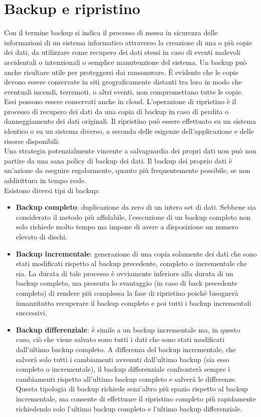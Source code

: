 \documentclass[12pt]{report}
\begin{document}
	\section{Backup e ripristino}
	Con il termine backup si indica il processo di messa in sicurezza delle informazioni di un sistema informatico attraverso la creazione di una o più copie dei dati, da utilizzare come recupero dei dati stessi in caso di eventi malevoli accidentali o intenzionali o semplice manutenzione del sistema. Un backup può anche risultare utile per proteggersi dai ransomware. È evidente che le copie devono essere conservate in siti geograficamente distanti tra loro in modo che eventuali incendi, terremoti, o altri eventi, non compromettano tutte le copie. Essi possono essere conservati anche in cloud. L'operazione di ripristino è il processo di recupero dei dati da una copia di backup in caso di perdita o danneggiamento dei dati originali. Il ripristino può essere effettuato su un sistema identico o su un sistema diverso, a seconda delle esigenze dell'applicazione e delle risorse disponibili.
	\vspace{\baselineskip}\\
	Una strategia potenzialmente vincente a salvaguardia dei propri dati non può non partire da una sana policy di backup dei dati. Il backup dei proprio dati è un’azione da eseguire regolarmente, quanto più frequentemente possibile, se non addirittura in tempo reale.
	\vspace{\baselineskip}\\
	Esistono diversi tipi di backup:
	\begin{itemize}
		\item \textbf{Backup completo}: duplicazione da zero di un intero set di dati. Sebbene sia considerato il metodo più affidabile, l’esecuzione di un backup completo non solo richiede molto tempo ma impone di avere a disposizione un 		numero elevato di dischi.
		\item \textbf{Backup incrementale}: generazione di una copia solamente dei dati che sono stati modificati rispetto al backup precedente, completo o incrementale che sia. La durata di tale processo è ovviamente inferiore alla durata di un backup completo, ma presenta lo svantaggio (in caso di back precedente completo) di rendere più complessa la fase di ripristino poichè bisognerà innanzitutto recuperare il backup completo e poi tutti i backup incrementali successivi.
		\item \textbf{Backup differenziale}:  è simile a un backup incrementale ma, in questo caso, ciò che viene salvato sono tutti i dati che sono stati modificati dall’ultimo backup completo. A differenza del backup incrementale, che salverà solo tutti i cambiamenti avvenuti dall’ultimo backup (sia esso completo o incrementale), il backup differenziale confronterà sempre i cambiamenti rispetto all’ultimo backup completo e salverà le differenze. Questa tipologia di backup richiede senz’altro più spazio rispetto al backup incrementale, ma consente di effettuare il ripristino completo più rapidamente richiedendo solo l’ultimo backup completo e l’ultimo backup
		differenziale.
	\end{itemize}
\end{document}
